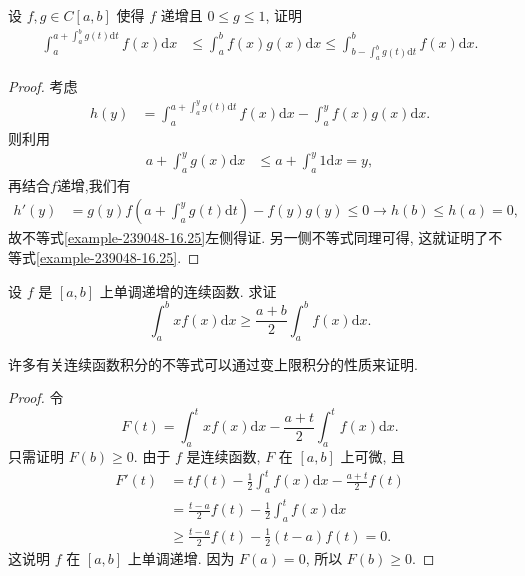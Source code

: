\documentclass[../../main.tex]{subfiles}
\begin{document}
\begin{example}
设 $f,g \in C[a,b]$ 使得 $f$ 递增且 $0 \leqslant g \leqslant 1$, 证明
\begin{align}\label{example-239048-16.25}
\int_{a}^{a + \int_{a}^{b}g(t)\mathrm{d}t}f(x)\mathrm{d}x &\leqslant \int_{a}^{b}f(x)g(x)\mathrm{d}x \leqslant \int_{b - \int_{a}^{b}g(t)\mathrm{d}t}^{b}f(x)\mathrm{d}x.
\end{align}
\end{example}
\begin{proof}
考虑
\begin{align*}
h(y) &= \int_{a}^{a + \int_{a}^{y}g(t)\mathrm{d}t}f(x)\mathrm{d}x - \int_{a}^{y}f(x)g(x)\mathrm{d}x.
\end{align*}
则利用
\begin{align*}
a + \int_{a}^{y}g(x)\mathrm{d}x &\leqslant a + \int_{a}^{y}1\mathrm{d}x = y,
\end{align*}
再结合$f$递增,我们有
\begin{align*}
h'(y) &= g(y)f\left(a + \int_{a}^{y}g(t)\mathrm{d}t\right) - f(y)g(y) \leqslant 0 \to h(b) \leqslant h(a) = 0,
\end{align*}
故不等式\eqref{example-239048-16.25}左侧得证. 另一侧不等式同理可得, 这就证明了不等式\eqref{example-239048-16.25}. 

\end{proof}

\begin{proposition}
设 $f$ 是 $[a,b]$ 上单调递增的连续函数. 求证
$$\int_a^b xf(x)\mathrm{d}x\geqslant \frac{a+b}{2}\int_a^b f(x)\mathrm{d}x.$$
\end{proposition}
\begin{note}
许多有关连续函数积分的不等式可以通过变上限积分的性质来证明.
\end{note}
\begin{proof}
令
$$F(t)=\int_a^t xf(x)\mathrm{d}x-\frac{a+t}{2}\int_a^t f(x)\mathrm{d}x.$$
只需证明 $F(b)\geqslant 0$. 由于 $f$ 是连续函数, $F$ 在 $[a,b]$ 上可微, 且
$$
\begin{aligned}
F'(t) &= tf(t)-\frac{1}{2}\int_a^t f(x)\mathrm{d}x-\frac{a+t}{2}f(t) \\
&= \frac{t-a}{2}f(t)-\frac{1}{2}\int_a^t f(x)\mathrm{d}x \\
&\geqslant  \frac{t-a}{2}f(t)-\frac{1}{2}(t-a)f(t)=0.
\end{aligned}
$$
这说明 $f$ 在 $[a,b]$ 上单调递增. 因为 $F(a)=0$, 所以 $F(b)\geqslant 0$.

\end{proof}
\end{document}
